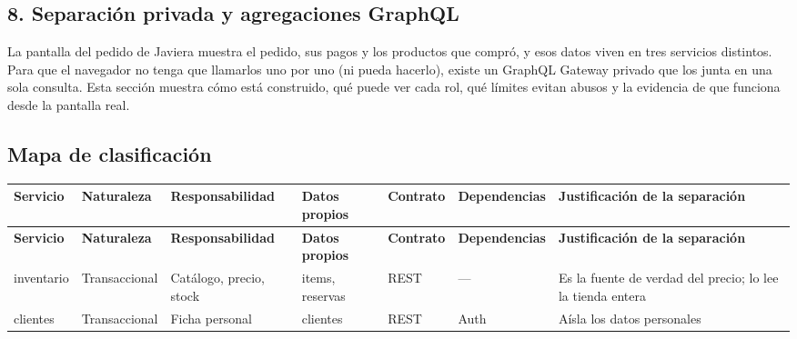 
\begin{landscape}
\section{8. Separación privada y agregaciones GraphQL}
La pantalla del pedido de Javiera muestra el pedido, sus pagos y los productos que compró, y esos datos viven en tres servicios distintos. Para que el navegador no tenga que llamarlos uno por uno (ni pueda hacerlo), existe un GraphQL Gateway privado que los junta en una sola consulta. Esta sección muestra cómo está construido, qué puede ver cada rol, qué límites evitan abusos y la evidencia de que funciona desde la pantalla real.

\subsection{Mapa de clasificación}
\vspace{0.6em}
{\scriptsize
\setlength{\LTpre}{0pt}\setlength{\LTpost}{0pt}
\setlength{\tabcolsep}{3pt}\renewcommand{\arraystretch}{1.15}
\begin{longtable}{|>{\raggedright\arraybackslash}p{}|>{\raggedright\arraybackslash}p{}|>{\raggedright\arraybackslash}p{}|>{\raggedright\arraybackslash}p{}|>{\raggedright\arraybackslash}p{}|>{\raggedright\arraybackslash}p{}|>{\raggedright\arraybackslash}p{}|}
\hline
\textbf{Servicio} & \textbf{Naturaleza} & \textbf{Responsabilidad} & \textbf{Datos propios} & \textbf{Contrato} & \textbf{Dependencias} & \textbf{Justificación de la separación} \\ \hline
\endfirsthead
\hline
\textbf{Servicio} & \textbf{Naturaleza} & \textbf{Responsabilidad} & \textbf{Datos propios} & \textbf{Contrato} & \textbf{Dependencias} & \textbf{Justificación de la separación} \\ \hline
\endhead
inventario & Transaccional & Catálogo, precio, stock & items, reservas & REST & — & Es la fuente de verdad del precio; lo lee la tienda entera \\ \hline
clientes & Transaccional & Ficha personal & clientes & REST & Auth & Aísla los datos personales \\ \hline

\end{longtable}}
\end{landscape}
